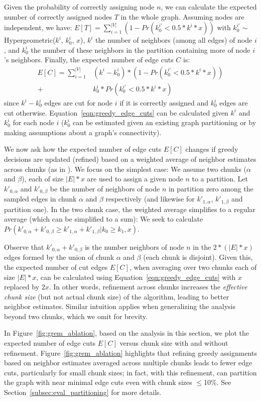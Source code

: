 Given the probability of correctly assigning node $n$, we can calculate the expected number of correctly assigned nodes $T$ in the whole graph. Assuming nodes are independent, we have:
$E[T] = \sum_{i=1}^{|V|}(1 - Pr(k^{i'}_0 < 0.5*k^i*x))$ 
with $k^{i'}_0 \sim$ Hypergeometric($k^i$, $k^i_0$, $x$), $k^i$ the number of neighbors (among all edges) of node $i$, and $k^i_0$ the number of these neighbors in the partition containing more of node $i$'s neighbors. Finally, the expected number of edge cuts $C$ is:
\begin{align}
    \label{eqn:greedy_edge_cuts}
    E[C] = \sum_{i=1}^{|V|}&(k^i - k^i_0)*(1 - Pr(k^{i'}_0 < 0.5*k^i*x))\\ +& k^i_0*Pr(k^{i'}_0 < 0.5*k^i*x) \nonumber
\end{align}
since $k^i - k^i_0$ edges are cut for node $i$ if it is correctly assigned and $k^i_0$ edges are cut otherwise. Equation~\ref{eqn:greedy_edge_cuts} can be calculated given $k^i$ and $k^i_0$ for each node $i$ ($k^i_0$ can be estimated given an existing graph partitioning or by making assumptions about a graph's connectivity).





We now ask how the expected number of edge cuts $E[C]$ changes if greedy decisions are updated (refined) based on a weighted average of neighbor estimates across chunks (as in \partitioning). We focus on the simplest case: We assume two chunks ($\alpha$ and $\beta$), each of size $|E|*x$ are used to assign a given node $n$ to a partition. Let $k'_{0, \alpha}$ and $k'_{0, \beta}$ be the number of neighbors of node $n$ in partition zero among the sampled edges in chunk $\alpha$ and $\beta$ respectively (and likewise for $k'_{1, \alpha}$, $k'_{1, \beta}$ and partition one). In the two chunk case, the weighted average simplifies to a regular average (which can be simplified to a sum): We seek to calculate $Pr(k'_{0, \alpha} + k'_{0, \beta} \ge k'_{1, \alpha} + k'_{1, \beta} | k_0 \ge k_1, x)$.

Observe that $k'_{0, \alpha} + k'_{0, \beta}$ is the number neighbors of node $n$ in the $2*(|E|*x)$ edges formed by the union of chunk $\alpha$ and $\beta$ (each chunk is disjoint). Given this, the expected number of cut edges $E[C]$, when averaging over two chunks each of size $|E|*x$, can be calculated using Equation~\ref{eqn:greedy_edge_cuts} with $x$ replaced by $2x$. In other words, refinement across chunks increases the \textit{effective chunk size} (but not actual chunk size) of the algorithm, leading to better neighbor estimates. Similar intuition applies when generalizing the analysis beyond two chunks, which we omit for brevity.

In Figure~\ref{fig:grem_ablation}, based on the analysis in this section, we plot the expected number of edge cuts $E[C]$ versus chunk size with and without refinement. Figure~\ref{fig:grem_ablation} highlights that refining greedy assignments based on neighbor estimates averaged across multiple chunks leads to fewer edge cuts, particularly for small chunk sizes; in fact, with this refinement, \partitioning can partition the graph with near minimal edge cuts even with chunk sizes $\le$10\%. See Section~\ref{subsec:eval_partitioning} for more details. 